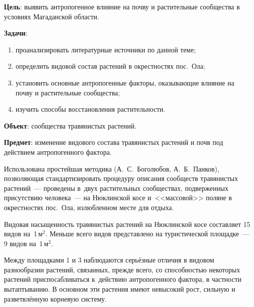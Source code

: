 \bigskip
{}



\makeProcTitleSchool


\textbf{Цель}: выявить антропогенное влияние на почву и растительные сообщества в условиях Магаданской области.

\textbf{Задачи}:
\begin{enumerate}[noitemsep]\vspace{-8pt}
\item проанализировать литературные источники по данной теме;
\item определить видовой состав растений в окрестностях пос.~Ола;
\item установить основные антропогенные факторы, оказывающие влияние на почву и растительные сообщества;
\item изучить способы восстановления растительности.	\enlargethispage{\baselineskip}
\end{enumerate}\vspace{-8pt}

\textbf{Объект}: сообщества травянистых растений.

\textbf{Предмет}: изменение видового состава травянистых растений и почв под действием антропогенного фактора.

Использована простейшая методика (А.~С.~Боголюбов, А.~Б.~Панков), позволяющая стандартизировать процедуру описания сообществ травянистых растений~--- проведены в~двух растительных сообществах, подверженных присутствию человека~--- на Нюклинской косе и~<<массовой>> поляне в окрестностях пос.~Ола, излюбленном месте для отдыха.

Видовая насыщенность травянистых растений на Нюклинской косе составляет 15 видов на~1\,м$^2$. Меньше всего видов представлено на туристической площадке~--- 9 видов на~1\,м$^2$.

Между площадками 1 и 3 наблюдаются серьёзные отличия в видовом разнообразии растений, связанных, прежде всего, со способностью некоторых растений приспосабливаться к~действию антропогенного фактора, в частности вытаптыванию. В основном эти растения имеют невысокий рост, сильную и разветвлённую корневую систему.

